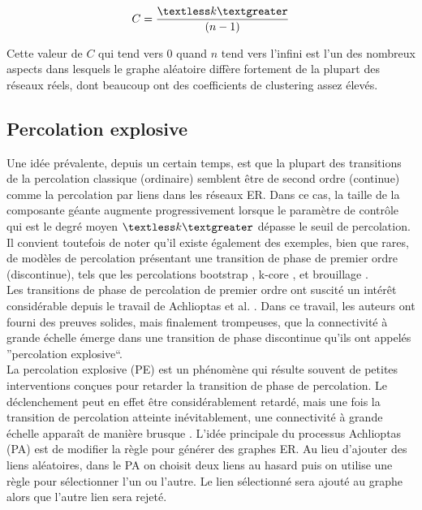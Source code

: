\begin{equation}
C=\dfrac{\textless k\textgreater}{(n - 1)}
\end{equation}

Cette valeur de $C$ qui tend vers $0$ quand $n$ tend vers l'infini est l'un des nombreux aspects dans lesquels le graphe aléatoire diffère fortement de la plupart des réseaux réels, dont beaucoup ont des coefficients de clustering assez élevés.

\subsection{Percolation explosive}
Une idée prévalente, depuis un certain temps, est que la plupart des transitions de la percolation classique (ordinaire) semblent être de second ordre (continue) comme la percolation par liens dans les réseaux ER. Dans ce cas,  la taille de la composante géante augmente progressivement lorsque le paramètre de contrôle qui est le degré moyen $\km$ dépasse le seuil de percolation. Il convient toutefois de noter qu'il existe également des exemples, bien que rares, de modèles de percolation présentant une transition de phase de premier ordre (discontinue), tels que les percolations bootstrap \cite{Adler1991}, k-core \cite{Dorogovtsev2-2006}, et brouillage \cite{Echenique-al2005}.\\ 
Les transitions de phase de percolation de premier ordre ont suscité un intérêt considérable depuis le travail de Achlioptas et al. \cite{Achlioptas-al2009}. Dans ce travail, les auteurs ont fourni des preuves solides, mais finalement trompeuses, que la connectivité à grande échelle émerge dans une transition de phase discontinue qu'ils ont appelés ''percolation explosive``.\\
La percolation explosive (PE) est un phénomène qui résulte souvent de petites interventions conçues pour retarder la transition de phase de percolation. Le déclenchement peut en effet être considérablement retardé, mais une fois la transition de percolation atteinte inévitablement, une connectivité à grande échelle apparaît de manière brusque \cite{Costa-al2010,Costa-al2015,Cho-Kahng2011}.
L'idée principale du processus Achlioptas (PA) \cite{Achlioptas-al2009} est de modifier la règle pour générer des graphes ER. Au lieu d'ajouter des liens aléatoires, dans le PA on choisit deux liens au hasard puis on utilise une règle pour sélectionner l'un ou l'autre. Le lien sélectionné sera ajouté au graphe alors que l'autre lien sera rejeté.\\ 
